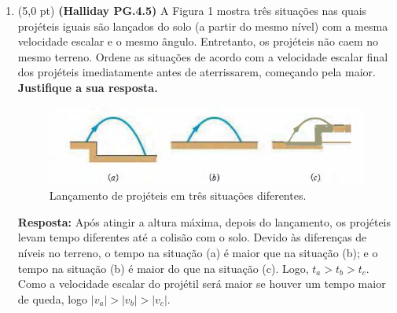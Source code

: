 \documentclass[12pt,a4paper,oneside]{article}
\begin{document}
\begin{enumerate}
	\begin{lstlisting}[language=JavaScript]
function emCadaPasso() {    
	bola.x += bola.vx; 
	
	if (bola.x > canvas.width - bola.raio){ 
		bola.x = canvas.width - bola.raio; 
		// TRECHO 1
	}
	if(/* TRECHO 2 */){
		// TRECHO 3
		bola.vx = -bola.vx;
	}
	
	bola.desenhar(contexto); 
}\end{lstlisting}

{\color{blue} {\bf Resposta:}}  \\
\begin{lstlisting}[language=JavaScript]
//TRECHO 1
bola.vx = -bola.vx;

//TRECHO 2
bola.x < bola.raio

//TRECHO 3
bola.x = bola.raio;
\end{lstlisting}

	
	\newpage
	
	\section*{Substitutiva do Teste 04}
	
		\item (5,0 pt) {\bf (Halliday PG.4.5)} A Figura 1 mostra três situações nas quais projéteis iguais são lançados do solo (a partir do mesmo nível) com a mesma velocidade escalar e o mesmo ângulo. Entretanto, os projéteis não caem no mesmo terreno. Ordene as situações de acordo com a velocidade escalar final dos projéteis imediatamente antes de aterrissarem, começando pela maior. {\bf Justifique a sua resposta.}
	
	\begin{figure}[htb]
		\begin{center}
			\includegraphics[scale=0.8]{images/fig1}
		\end{center}
		\caption{Lançamento de projéteis em três situações diferentes.}
	\end{figure}

	{\color{blue} {\bf Resposta:} Após atingir a altura máxima, depois do lançamento, os projéteis levam tempo diferentes até a colisão com o solo. Devido às diferenças de níveis no terreno, o tempo na situação (a) é maior que na situação (b); e o tempo na situação (b) é maior do que na situação (c). Logo, $t_a >  t_b > t_c$. Como a velocidade escalar do projétil será maior se houver um tempo maior de queda, logo $|v_a| > |v_b| > |v_c|$.
	}
	

\end{enumerate}
\end{document}
